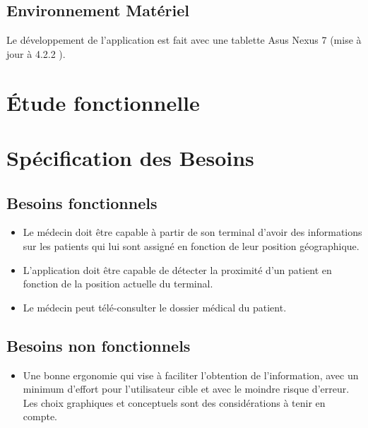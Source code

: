 
\subsection{Environnement Matériel}

Le développement de l'application est fait avec une tablette Asus Nexus 7 (mise à jour à \android{} 4.2.2 ).

\section{Étude fonctionnelle}

\section{Spécification des Besoins}

\subsection{Besoins fonctionnels}

\begin{itemize}

\item Le médecin doit être capable à partir de son terminal d’avoir des
informations sur les patients qui lui sont assigné en fonction de leur position
géographique.

\item L'application doit être capable de détecter la proximité d'un
patient en fonction de la position actuelle du terminal.

\item Le médecin peut télé-consulter le dossier médical du patient.

\end{itemize}

\subsection{Besoins non fonctionnels}

\begin{itemize}

\item Une bonne ergonomie qui vise à faciliter l'obtention de
l'information, avec un minimum d'effort pour l'utilisateur cible et
avec le moindre risque d'erreur. Les choix graphiques et conceptuels
sont des considérations à tenir en compte.

\end{itemize}

